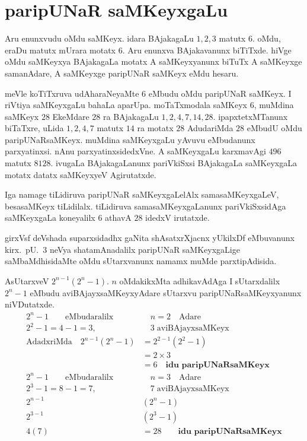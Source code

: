 \chapter{paripUNaR saMKeyxgaLu}

\vskip -20pt
Aru enunxvudu oMdu saMKeyx. idara BAjakagaLu $1,2,3$ matutx $6$. oMdu, eraDu matutx mUrara motatx $6$. 
Aru enunxva BAjakavanunx biTiTxde. hiVge oMdu saMKeyxya BAjakagaLa motatx A saMKeyxyanunx biTuTx A saMKeyxge samanAdare, A saMKeyxge paripUNaR saMKeyx eMdu hesaru.

meVle koTiTxruva  udAharaNeyaMte $6$ eMbudu oMdu paripUNaR saMKeyx. I riVtiya saMKeyxgaLu bahaLa aparUpa.  moTaTxmodala saMKeyx $6$, muMdina saMKeyx $28$ EkeMdare $28$ ra BAjakagaLu $1,2,4,7,14,28$. ipapxtetxMTanunx biTaTxre, uLida $1,2,4,7$ matutx $14$ ra motatx $28$ AdudariMda $28$ eMbudU oMdu paripUNaRsaMKeyx. muMdina saMKeyxgaLu yAvuvu eMbudanunx parxyatinxsi. nAnu parxyatinxsidedxVne. A saMKeyxgaLu karxmavAgi $496$ matutx $8128$. ivugaLa BAjakagaLanunx pariVkiSxsi BAjakagaLa saMKeyxgaLa motatx datatx saMKeyxyeV Agirutatxde.  

Iga namage tiLidiruva paripUNaR saMKeyxgaLelAlx samasaMKeyxgaLeV, besasaMKeyx tiLidilalx. tiLidiruva samasaMKeyxgaLanunx pariVkiSxsidAga saMKeyxgaLa koneyalilx $6$ athavA $28$ idedxV irutatxde.

girxVsf deVshada suparxsidadhx gaNita shAsatxrXjacnx yUkilxDf eMbuvanunx kirx.~pU.\ $3$ neVya shatamAnadalilx paripUNaR saMKeyxgaLige saMbaMdhisidaMte oMdu sUtarxvanunx namamx muMde parxtipAdisida.

AsUtarxveV $2^{n-1}(2^{n}-1)$. $n$ oMdakikxMta adhikavAdAga I sUtarxdalilx $2^{n}-1$ eMbudu aviBAjayxsaMKeyxyAdare sUtarxvu paripUNaRsaMKeyxyanunx niVDutatxde. 
\begin{align*}
2^{n}-1 \qquad\text{eMbudaralilx}&  \quad n=2 \quad\text{Adare}\\
2^{2}-1 = 4-1 =3, &\quad 3\;\text{aviBAjayxsaMKeyx}\\
\text{AdadxriMda}\quad 2^{n-1}(2^{n}-1) &= 2^{2-1}(2^{2}-1)\\
&=2\times 3\\
&=6 \quad \textbf{idu paripUNaRsaMKeyx}\\[0.1cm]%
2^{n}-1 \qquad\text{eMbudaralilx} &\quad n=3 \quad\text{Adare}\\
2^{3}-1 = 8-1 = 7, &\quad 7\; \text{aviBAjayxsaMKeyx}\\
2^{n-1}&(2^{n}-1)\\
2^{3-1}&(2^{3}-1)\\
4(7) &= 28 \qquad\textbf{idu paripUNaRsaMKeyx}
\end{align*}

